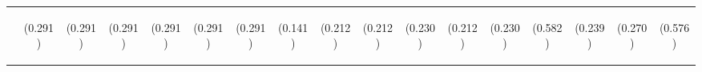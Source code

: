 \begin{center}
\begin{tabular}{lcccccccccccccccc}
 & \begin{footnotesize}(0.291)\end{footnotesize} & \begin{footnotesize}(0.291)\end{footnotesize} & \begin{footnotesize}(0.291)\end{footnotesize} & \begin{footnotesize}(0.291)\end{footnotesize} & \begin{footnotesize}(0.291)\end{footnotesize} & \begin{footnotesize}(0.291)\end{footnotesize} & \begin{footnotesize}(0.141)\end{footnotesize} & \begin{footnotesize}(0.212)\end{footnotesize} & \begin{footnotesize}(0.212)\end{footnotesize} & \begin{footnotesize}(0.230)\end{footnotesize} & \begin{footnotesize}(0.212)\end{footnotesize} & \begin{footnotesize}(0.230)\end{footnotesize} & \begin{footnotesize}(0.582)\end{footnotesize} & \begin{footnotesize}(0.239)\end{footnotesize} & \begin{footnotesize}(0.270)\end{footnotesize} & \begin{footnotesize}(0.576)\end{footnotesize} \\

\end{tabular}
\end{center}
